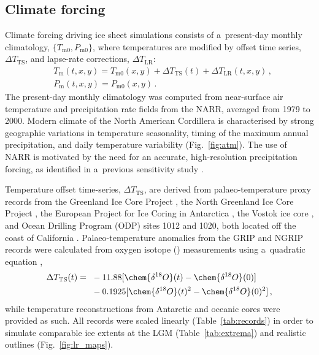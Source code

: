 \documentclass[tc, manuscript]{copernicus}
\begin{document}
\subsection{Climate forcing}
\label{sec:atm}%

      Climate forcing driving ice sheet simulations consists of
      a~present-day monthly climatology, $\{T_{\mathrm{m}0},
      P_{\mathrm{m}0}\}$, where temperatures are modified by offset time
      series, ${\Delta}T_{\text{TS}}$, and lapse-rate corrections,
      ${\Delta}T_{\text{LR}}$:
\begin{align}
&T_{\mathrm{m}}(t, x, y) = T_{\mathrm{m}0}(x, y) + {\Delta}T_{\text{TS}}(t)
                    + {\Delta}T_{\text{LR}}(t, x, y) \,, \\
&    P_{\mathrm{m}}(t, x, y) = P_{\mathrm{m}0}(x, y) \,.
\end{align}
      The present-day monthly climatology was computed from near-surface air
      temperature and precipitation rate fields from the NARR, averaged from
      1979 to 2000. Modern climate of the North American Cordillera is
      characterised by strong geographic variations in temperature
      seasonality, timing of the maximum annual precipitation, and daily
      temperature variability (Fig.~\ref{fig:atm}). The use of NARR is
      motivated by the need for an accurate, high-resolution precipitation
      forcing, as identified in a~previous sensitivity study
      \citep{Seguinot.etal.2014}.

      Temperature offset time-series, ${\Delta}T_{\text{TS}}$, are derived
      from palaeo-temperature proxy records from the Greenland Ice Core
      Project \citep[GRIP,][]{Dansgaard.etal.1993}, the North Greenland Ice
      Core Project \citep[NGRIP,][]{Andersen.etal.2004}, the European
      Project for Ice Coring in Antarctica \citep[EPICA,][]
      {Jouzel.etal.2007}, the Vostok ice core \citep{Petit.etal.1999}, and
      Ocean Drilling Program (ODP) sites 1012 and 1020, both located off the
      coast of California \citep{Herbert.etal.2001}. Palaeo-temperature
      anomalies from the GRIP and NGRIP records were calculated from oxygen
      isotope () measurements using a~quadratic equation
      \citep{Johnsen.etal.1995},
\begin{align}
{\Delta}T_{\text{TS}}(t) ={~}&-11.88 [\chem{\delta^{18}O}(t)
                                -\chem{\delta^{18}O}(0)] \nonumber \\
                        &-0.1925[\chem{\delta^{18}O}(t)^2
                                 -\chem{\delta^{18}O}(0)^2] \,,
\end{align}
      while temperature reconstructions from Antarctic and oceanic cores
      were provided as such. All records were scaled linearly
      (Table~\ref{tab:records}) in order to simulate comparable ice extents
      at the LGM (Table~\ref{tab:extrema}) and realistic outlines
      (Fig.~\ref{fig:lr_maps}).
\end{document}
